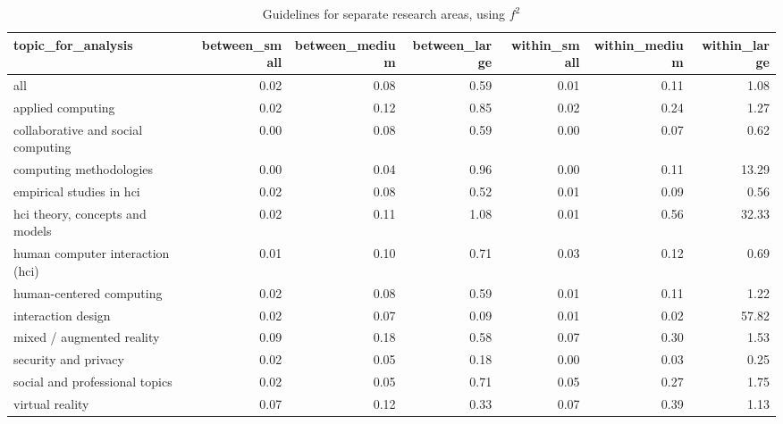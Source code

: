 \begin{table}[ht]
\centering
\begin{tabular}{lrrrrrr}
  \hline
topic\_for\_analysis & between\_small & between\_medium & between\_large & within\_small & within\_medium & within\_large \\ 
  \hline
all & 0.02 & 0.08 & 0.59 & 0.01 & 0.11 & 1.08 \\ 
  applied computing & 0.02 & 0.12 & 0.85 & 0.02 & 0.24 & 1.27 \\ 
  collaborative and social computing & 0.00 & 0.08 & 0.59 & 0.00 & 0.07 & 0.62 \\ 
  computing methodologies & 0.00 & 0.04 & 0.96 & 0.00 & 0.11 & 13.29 \\ 
  empirical studies in hci & 0.02 & 0.08 & 0.52 & 0.01 & 0.09 & 0.56 \\ 
  hci theory, concepts and models & 0.02 & 0.11 & 1.08 & 0.01 & 0.56 & 32.33 \\ 
  human computer interaction (hci) & 0.01 & 0.10 & 0.71 & 0.03 & 0.12 & 0.69 \\ 
  human-centered computing & 0.02 & 0.08 & 0.59 & 0.01 & 0.11 & 1.22 \\ 
  interaction design & 0.02 & 0.07 & 0.09 & 0.01 & 0.02 & 57.82 \\ 
  mixed / augmented reality & 0.09 & 0.18 & 0.58 & 0.07 & 0.30 & 1.53 \\ 
  security and privacy & 0.02 & 0.05 & 0.18 & 0.00 & 0.03 & 0.25 \\ 
  social and professional topics & 0.02 & 0.05 & 0.71 & 0.05 & 0.27 & 1.75 \\ 
  virtual reality & 0.07 & 0.12 & 0.33 & 0.07 & 0.39 & 1.13 \\ 
   \hline
\end{tabular}
\caption{Guidelines for separate research areas, using $f^2$} 
\label{tab:es guidelines fsquared-es different topics}
\end{table}

